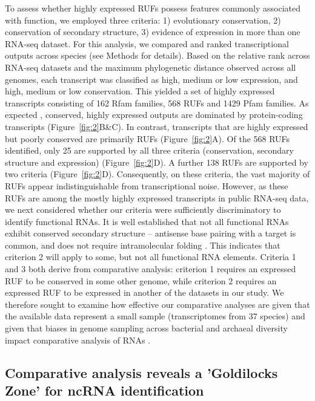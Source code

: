 \documentclass[10pt]{article}
\begin{document}
To assess whether highly expressed RUFs possess features commonly
associated with function, we employed three criteria: 1) evolutionary
conservation, 2) conservation of secondary structure, 3) evidence of
expression in more than one RNA-seq dataset. For this analysis, we
compared and ranked transcriptional outputs across species (see
Methods for details). Based on the relative rank across RNA-seq
datasets and the maximum phylogenetic distance observed across all
genomes, each transcript was classified as high, medium or low
expression, and high, medium or low conservation. This yielded a set
of highly expressed transcripts consisting of 162 Rfam families, 568
RUFs and 1429 Pfam families. As expected
\cite{Rocha:2003,Pal:2001,Drummond:2005}, conserved, highly expressed
outputs are dominated by protein-coding transcripts
(Figure~\ref{fig:2}B\&C). In contrast, transcripts that are highly
expressed but poorly conserved are primarily RUFs
(Figure~\ref{fig:2}A). Of the 568 RUFs identified, only 25 are
supported by all three criteria (conservation, secondary structure and
expression) (Figure~\ref{fig:2}D). A further 138 RUFs are supported by two criteria
(Figure~\ref{fig:2}D). Consequently, on these criteria, the vast majority of RUFs
appear indistinguishable from transcriptional noise. However, as these
RUFs are among the mostly highly expressed transcripts in public
RNA-seq data, we next considered whether our criteria were
sufficiently discriminatory to identify functional RNAs. It is well
established that not all functional RNAs exhibit conserved secondary
structure – antisense base pairing with a target is common, and does
not require intramolecular folding \cite{Gottesman:2011}. This
indicates that criterion 2 will apply to some, but not all functional
RNA elements. Criteria 1 and 3 both derive from comparative analysis:
criterion 1 requires an expressed RUF to be conserved in some other
genome, while criterion 2 requires an expressed RUF to be expressed in
another of the datasets in our study. We therefore sought to examine
how effective our comparative analyses are given that the available
data represent a small sample (transcriptomes from 37 species) and
given that biases in genome sampling across bacterial and archaeal
diversity impact comparative analysis of RNAs \cite{Hoeppner:2012}.

\subsection*{Comparative analysis reveals a 'Goldilocks Zone' for ncRNA identification}
\end{document}
